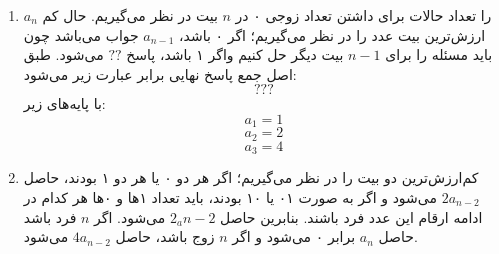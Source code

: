 \p
\begin{enumerate}
\item
$a_n$
را تعداد حالات برای داشتن تعداد زوجی ۰ در 
$n$
بیت در نظر می‌گیریم.
حال کم ارزش‌ترین بیت عدد را در نظر می‌گیریم؛ اگر ۰ باشد،
$a_{n-1}$
جواب می‌باشد چون باید مسئله را برای
$n - 1$
بیت دیگر حل کنیم واگر ۱ باشد، پاسخ
$??$
می‌شود. طبق اصل جمع پاسخ نهایی برابر عبارت زیر می‌شود:
$$???$$
با پایه‌های زیر:
$$a_1 = 1$$
$$a_2 = 2$$
$$a_3 = 4$$
\item
کم‌ارزش‌ترین دو بیت را در نظر می‌گیریم؛ اگر هر دو ۰ یا هر دو ۱ بودند، حاصل
$2a_{n-2}$
می‌شود و اگر به صورت ۰۱ یا ۱۰ بودند، باید تعداد ۱ها و ۰ها هر کدام در ادامه ارقام این عدد فرد باشند. بنابرین حاصل
$2_a{n-2}$
می‌شود.
اگر
$n$
فرد باشد حاصل
$a_n$
برابر ۰ می‌شود و اگر 
$n$
زوج باشد، حاصل
$4a_{n-2}$
می‌شود.
\end{enumerate}